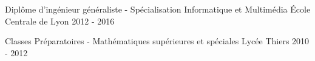 

\begin{cventries}

	\cventry
	{Diplôme d'ingénieur généraliste - Spécialisation Informatique et Multimédia}
	{}
	{École Centrale de Lyon}
	{}
	{2012 - 2016}
	{}
	{}

	\cventry
	{Classes Préparatoires - Mathématiques supérieures et spéciales}
	{}
	{Lycée Thiers}
	{}
	{2010 - 2012}
	{}
	{}
\end{cventries}
